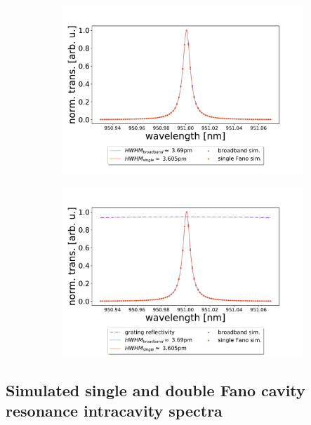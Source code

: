 \begin{figure}[h!]
    \centering
    \begin{subfigure}[b]{0.49\textwidth}
        \includegraphics[width=\textwidth]{figures/sim_single_vs_broadband_1000um.pdf}
        \caption{}
        \label{fig:single_vs_broadband_simulation_1000um}
    \end{subfigure}
    \begin{subfigure}[b]{0.49\textwidth}
        \includegraphics[width=\textwidth]{figures/sim_single_vs_broadband_1000um_with_reflectivity.pdf}
        \caption{}
        \label{fig:single_vs_broadband_simulation_with_ref_1000um}
    \end{subfigure}
\end{figure}

\clearpage
\subsection{Simulated single and double Fano cavity resonance intracavity spectra}


